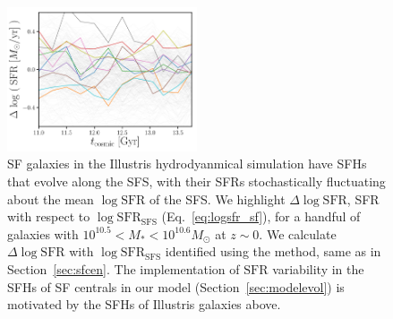 \documentclass[12pt, letterpaper, preprint, tighten]{aastex62}
\newcommand{\logsfr}{\log\mathrm{SFR}}
\newcommand{\logsfrsfs}{\log\mathrm{SFR}_\mathrm{SFS}}
\begin{document}
\begin{figure}
\begin{center}
\includegraphics[width=0.5\textwidth]{figs/illustris_sfh.pdf}
    \caption{SF galaxies in the Illustris hydrodyanmical simulation have SFHs that evolve 
    along the SFS, with their SFRs stochastically fluctuating about the mean $\logsfr$ 
    of the SFS. We highlight $\Delta \logsfr$, SFR with respect to $\logsfrsfs$ (Eq.~\ref{eq:logsfr_sf}),
    for a handful of galaxies with $10^{10.5}< M_* < 10^{10.6}M_\odot$ at $z\sim0$.
    We calculate $\Delta \logsfr$ with $\logsfrsfs$ identified using the \cite{hahn2018a}
    method, same as in Section~\ref{sec:sfcen}. The implementation of $\mathrm{SFR}$
    variability in the SFHs of SF centrals in our model (Section~\ref{sec:modelevol})
    is motivated by the SFHs of Illustris galaxies above.
    }
\label{fig:illsfh}
\end{center}
\end{figure}
\end{document}
